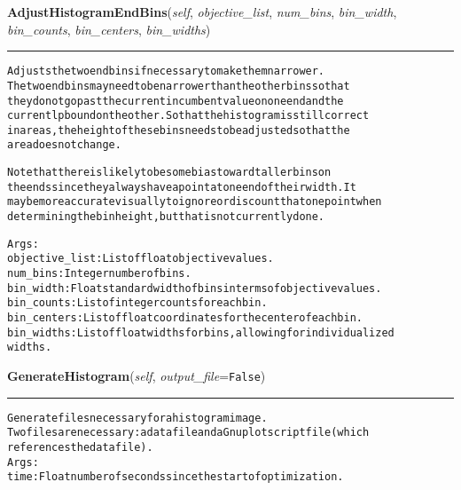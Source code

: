 \hspace{.8\funcindent}\begin{boxedminipage}{\funcwidth}

    \raggedright \textbf{AdjustHistogramEndBins}(\textit{self}, \textit{objective\_list}, \textit{num\_bins}, \textit{bin\_width}, \textit{bin\_counts}, \textit{bin\_centers}, \textit{bin\_widths})

    \vspace{-1.5ex}

    \rule{\textwidth}{0.5\fboxrule}
\setlength{\parskip}{2ex}
\begin{alltt}

Adjusts the two end bins if necessary to make them narrower.
The two end bins may need to be narrower than the other bins so that
they do not go past the current incumbent value on one end and the
current lp bound on the other.  So that the histogram is still correct
in areas, the height of these bins needs to be adjusted so that the
area does not change.

Note that there is likely to be some bias toward taller bins on
the ends since they always have a point at one end of their width.  It
may be more accurate visually to ignore or discount that one point when
determining the bin height, but that is not currently done.

Args:
  objective\_list: List of float objective values.
  num\_bins: Integer number of bins.
  bin\_width: Float standard width of bins in terms of objective values.
  bin\_counts: List of integer counts for each bin.
  bin\_centers: List of float coordinates for the center of each bin.
  bin\_widths: List of float widths for bins, allowing for individualized
    widths.
\end{alltt}

\setlength{\parskip}{1ex}
    \end{boxedminipage}

    \label{coinor:grumpy:BB:BBTree:GenerateHistogram}

    \vspace{0.5ex}

\hspace{.8\funcindent}\begin{boxedminipage}{\funcwidth}

    \raggedright \textbf{GenerateHistogram}(\textit{self}, \textit{output\_file}={\tt False})

    \vspace{-1.5ex}

    \rule{\textwidth}{0.5\fboxrule}
\setlength{\parskip}{2ex}
\begin{alltt}

Generate files necessary for a histogram image.
Two files are necessary: a data file and a Gnuplot script file (which
references the data file).
Args:
  time: Float number of seconds since the start of optimization.
\end{alltt}

\setlength{\parskip}{1ex}
    \end{boxedminipage}

